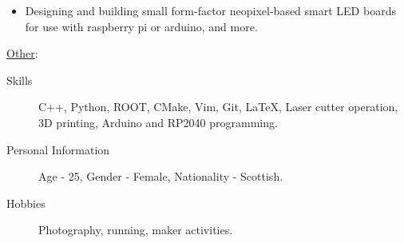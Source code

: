 \documentclass[10pt]{article}
\begin{document}
\begin{bgbox}[height=\paperheight,colback=gray,width=0.7\textwidth]
\begin{description}
\begin{description}
            \begin{itemize}
                \item Designing and building small form-factor neopixel-based smart LED boards for use with raspberry pi or arduino, and more.
            \end{itemize}
        \end{description}
    \end{description}
    \begin{description}
        \item \underline{Other}:
        \begin{description}
            \item[Skills] C++, Python, ROOT, CMake, Vim, Git, LaTeX, Laser cutter operation, 3D printing, Arduino and RP2040 programming.
            \item[Personal Information] Age - 25, Gender - Female, Nationality - Scottish.
            \item[Hobbies] Photography, running, maker activities.
        \end{description}
    \end{description}

\end{bgbox}
\end{document}
